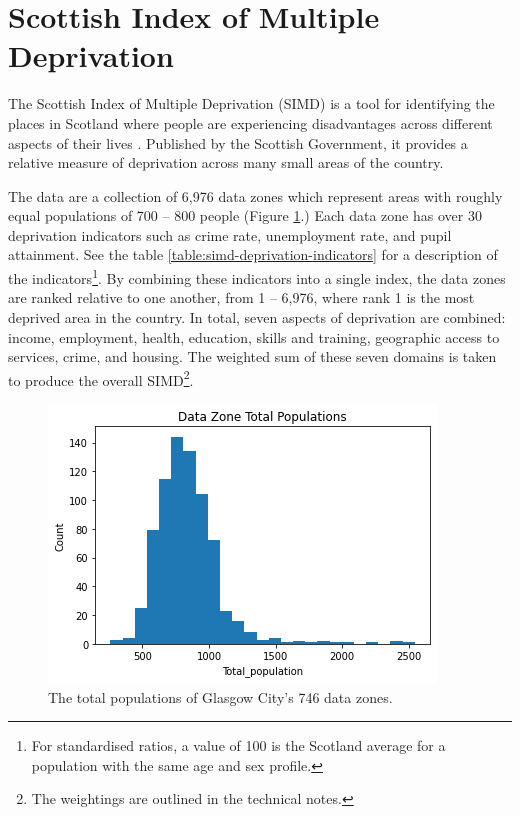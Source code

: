 \documentclass{thesis}
\begin{document}
\section{Scottish Index of Multiple Deprivation}

The Scottish Index of Multiple Deprivation (SIMD) is a tool for identifying the places in Scotland where people are experiencing disadvantages across different aspects of their lives \cite{simd}. Published by the Scottish Government, it provides a relative measure of deprivation across many small areas of the country.

The data are a collection of 6,976 data zones which represent areas with roughly equal populations of 700 -- 800 people (Figure \ref{fig:dz-total-populations}.) Each data zone has over 30 deprivation indicators such as crime rate, unemployment rate, and pupil attainment. See the table \ref{table:simd-deprivation-indicators} for a description of the indicators\footnote{For standardised ratios, a value of 100 is the Scotland average for a population with the same age and sex profile.}. By combining these indicators into a single index, the data zones are ranked relative to one another, from 1 -- 6,976, where rank 1 is the most deprived area in the country. In total, seven aspects of deprivation are combined: income, employment, health, education, skills and training, geographic access to services, crime, and housing. The weighted sum of these seven domains is taken to produce the overall SIMD\footnote{The weightings are outlined in the technical notes\cite{simd-technical-notes}.}.

\begin{figure}[h]
    \centering
    \includegraphics[scale=0.6]{images/dz-total-population.png}
    \caption{The total populations of Glasgow City's 746 data zones.}
    \label{fig:dz-total-populations}
\end{figure}
\end{document}
